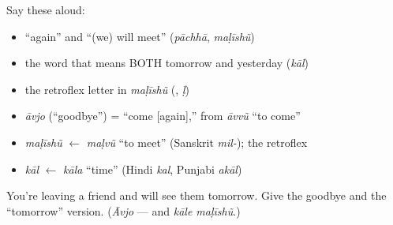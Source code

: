 \begin{cousinweb}
Say these aloud:

\begin{itemize}
\raggedright
  \item \textquotedblleft{}again\textquotedblright{} and \textquotedblleft{}(we) will meet\textquotedblright{} (\emph{pāchhā}, \emph{maḷīshũ})
  \item the word that means BOTH tomorrow and yesterday (\emph{kāl})
  \item the retroflex letter in \emph{maḷīshũ} (, \emph{ḷ})
\end{itemize}
\end{cousinweb}

\begin{grammarlens}[title={What you've built — roots you now carry}]
\begin{itemize}
\raggedright
  \item \emph{āvjo} (\textquotedblleft{}goodbye\textquotedblright{}) = \textquotedblleft{}come {[}again{]},\textquotedblright{} from \emph{āvvũ} \textquotedblleft{}to come\textquotedblright{}
  \item \emph{maḷīshũ} $\leftarrow$ \emph{maḷvũ} \textquotedblleft{}to meet\textquotedblright{} (Sanskrit \emph{mil-}); the retroflex 
  \item \emph{kāl} $\leftarrow$ \emph{kāla} \textquotedblleft{}time\textquotedblright{} (Hindi \emph{kal}, Punjabi \emph{akāl})
\end{itemize}
\end{grammarlens}

\begin{tcolorbox}[breakable,colback=teal!4,colframe=teal!35!black,title={Before you move on}]
You're leaving a friend and will see them tomorrow. Give the goodbye and the \textquotedblleft{}tomorrow\textquotedblright{} version. (\emph{Āvjo} — and \emph{kāle maḷīshũ}.)
\end{tcolorbox}
